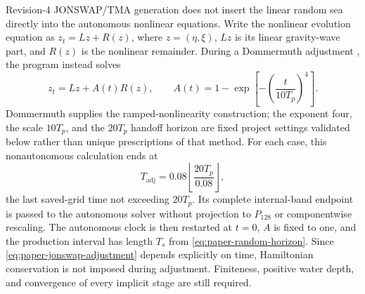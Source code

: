 Revision-4 JONSWAP/TMA generation does not insert the linear random sea
directly into the autonomous nonlinear equations.  Write the nonlinear
evolution equation as $z_t=Lz+R(z)$, where $z=(\eta,\xi)$, $Lz$ is its
linear gravity-wave part, and $R(z)$ is the nonlinear remainder.  During a
Dommermuth adjustment \cite{dommermuth2000}, the program instead solves
\begin{equation}
  z_t=Lz+A(t)R(z),
  \qquad
  A(t)=1-\exp\!\left[-\left(\frac{t}{10T_p}\right)^4\right].
  \label{eq:paper-jonswap-adjustment}
\end{equation}
Dommermuth supplies the ramped-nonlinearity construction; the exponent four,
the scale $10T_p$, and the $20T_p$ handoff horizon are fixed project
settings validated below rather than unique prescriptions of that method.
For each case, this nonautonomous calculation ends at
\begin{equation}
  T_{\mathrm{adj}}
  =0.08\left\lfloor\frac{20T_p}{0.08}\right\rfloor,
  \label{eq:paper-jonswap-adjustment-time}
\end{equation}
the last saved-grid time not exceeding $20T_p$.  Its complete internal-band
endpoint is passed to the autonomous solver without projection to
$P_{128}$ or componentwise rescaling.  The autonomous clock is then restarted
at $t=0$, $A$ is fixed to one, and the production interval has length
$T_s$ from \cref{eq:paper-random-horizon}.  Since
\cref{eq:paper-jonswap-adjustment} depends explicitly on time, Hamiltonian
conservation is not imposed during adjustment.  Finiteness, positive water
depth, and convergence of every implicit stage are still required.

